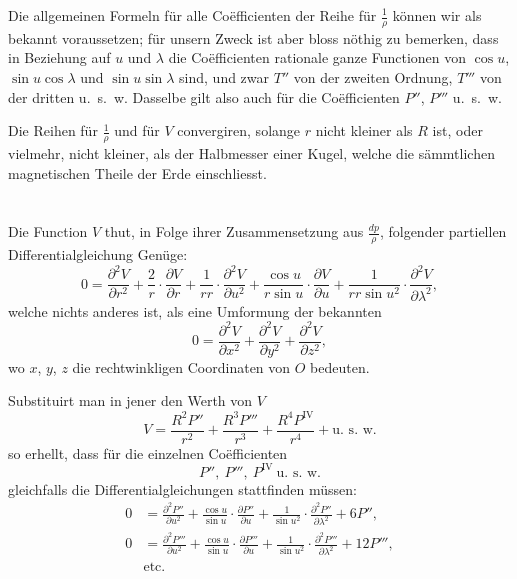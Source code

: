 \documentclass[fontsize=11pt,paper=a4,twoside,openany]{scrbook}
\begin{document}
Die allgemeinen Formeln für alle Coëfficienten der Reihe für $\frac{1}{\rho}$ können wir als bekannt voraussetzen; für unsern Zweck ist aber bloss nöthig zu bemerken, dass in Beziehung auf $u$ und $\lambda$ die Coëfficienten rationale ganze Functionen von $\cos u$, $\sin u\cos\lambda$ und $\sin u\sin\lambda$ sind, und zwar $T''$ von der zweiten Ordnung, $T'''$ von der dritten u.~s.~w. Dasselbe gilt also auch für die Coëfficienten $P''$, $P'''$ u.~s.~w.

Die Reihen für $\frac{1}{\rho}$ und für $V$ convergiren, solange $r$ nicht kleiner als $R$ ist, oder vielmehr, nicht kleiner, als der Halbmesser einer Kugel, welche die sämmtlichen magnetischen Theile der Erde einschliesst.

\section{}

Die Function $V$ thut, in Folge ihrer Zusammensetzung aus $\frac{dp}{\rho}$, folgender partiellen Differentialgleichung Genüge:
\[
0 = \frac{\partial^2 V}{\partial r^2} + \frac{2}{r}\cdot\frac{\partial V}{\partial r} + \frac{1}{rr}\cdot\frac{\partial^2 V}{\partial u^2} + \frac{\cos u}{r\sin u}\cdot\frac{\partial V}{\partial u} + \frac{1}{rr\sin u^2}\cdot\frac{\partial^2 V}{\partial \lambda^2},
\]
welche nichts anderes ist, als eine Umformung der bekannten
\[
0 = \frac{\partial^2 V}{\partial x^2} + \frac{\partial^2 V}{\partial y^2} + \frac{\partial^2 V}{\partial z^2},
\]
wo $x$, $y$, $z$ die rechtwinkligen Coordinaten von $O$ bedeuten.

Substituirt man in jener den Werth von $V$
\[
V = \frac{R^2 P''}{r^2} + \frac{R^3 P'''}{r^3} + \frac{R^4 P^{\mathrm{IV}}}{r^4} + \text{u.~s.~w.}
\]
so erhellt, dass für die einzelnen Coëfficienten
\[
P'',\ P''',\ P^{\mathrm{IV}}\ \text{u.~s.~w.}
\]
gleichfalls die Differentialgleichungen stattfinden müssen:
\begin{align*}
0 &= \frac{\partial^2 P''}{\partial u^2} + \frac{\cos u}{\sin u}\cdot\frac{\partial P''}{\partial u} + \frac{1}{\sin u^2}\cdot\frac{\partial^2 P''}{\partial \lambda^2} + 6P'',\\
0 &= \frac{\partial^2 P'''}{\partial u^2} + \frac{\cos u}{\sin u}\cdot\frac{\partial P'''}{\partial u} + \frac{1}{\sin u^2}\cdot\frac{\partial^2 P'''}{\partial \lambda^2} + 12P''',\\
&\text{etc.}
\end{align*}
\end{document}
